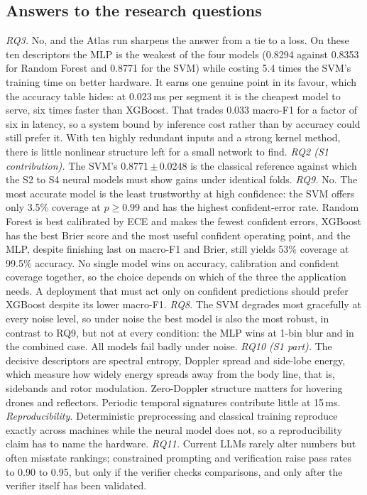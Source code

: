 \documentclass[conference]{IEEEtran}
\newcommand{\pmv}[2]{#1\,$\pm$\,#2}
\begin{document}
\subsection{Answers to the research questions}
\emph{RQ3.} No, and the Atlas run sharpens the answer from a tie to a loss. On these ten descriptors the MLP is the weakest of the four models (0.8294 against 0.8353 for Random Forest and 0.8771 for the SVM) while costing 5.4 times the SVM's training time on better hardware. It earns one genuine point in its favour, which the accuracy table hides: at 0.023\,ms per segment it is the cheapest model to serve, six times faster than XGBoost. That trades 0.033 macro-F1 for a factor of six in latency, so a system bound by inference cost rather than by accuracy could still prefer it. With ten highly redundant inputs and a strong kernel method, there is little nonlinear structure left for a small network to find. \emph{RQ2 (S1 contribution).} The SVM's \pmv{0.8771}{0.0248} is the classical reference against which the S2 to S4 neural models must show gains under identical folds. \emph{RQ9.} No. The most accurate model is the least trustworthy at high confidence: the SVM offers only 3.5\% coverage at $p\ge0.99$ and has the highest confident-error rate. Random Forest is best calibrated by ECE and makes the fewest confident errors, XGBoost has the best Brier score and the most useful confident operating point, and the MLP, despite finishing last on macro-F1 and Brier, still yields 53\% coverage at 99.5\% accuracy. No single model wins on accuracy, calibration and confident coverage together, so the choice depends on which of the three the application needs. A deployment that must act only on confident predictions should prefer XGBoost despite its lower macro-F1. \emph{RQ8.} The SVM degrades most gracefully at every noise level, so under noise the best model is also the most robust, in contrast to RQ9, but not at every condition: the MLP wins at 1-bin blur and in the combined case. All models fail badly under noise. \emph{RQ10 (S1 part).} The decisive descriptors are spectral entropy, Doppler spread and side-lobe energy, which measure how widely energy spreads away from the body line, that is, sidebands and rotor modulation. Zero-Doppler structure matters for hovering drones and reflectors. Periodic temporal signatures contribute little at 15\,ms. \emph{Reproducibility.} Deterministic preprocessing and classical training reproduce exactly across machines while the neural model does not, so a reproducibility claim has to name the hardware. \emph{RQ11.} Current LLMs rarely alter numbers but often misstate rankings; constrained prompting and verification raise pass rates to 0.90 to 0.95, but only if the verifier checks comparisons, and only after the verifier itself has been validated.
\end{document}
